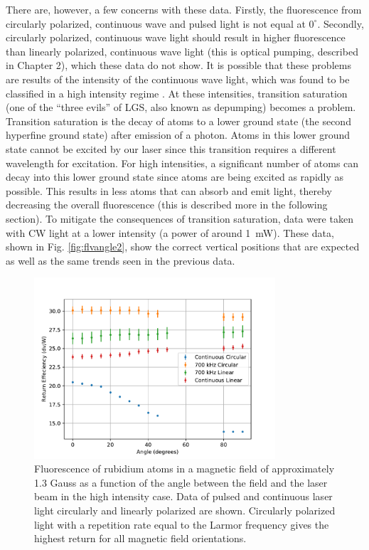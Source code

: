 There are, however, a few concerns with these data. Firstly, the fluorescence from circularly polarized, continuous wave and pulsed light is not equal at $0^{\circ}$. Secondly, circularly polarized, continuous wave light should result in higher fluorescence than linearly polarized, continuous wave light (this is optical pumping, described in Chapter 2), which these data do not show. It is possible that these problems are results of the intensity of the continuous wave light, which was found to be classified in a high intensity regime \cite{Kane2014}. At these intensities, transition saturation (one of the ``three evils'' of LGS, also known as depumping) becomes a  problem. Transition saturation is the decay of atoms to a lower ground state (the second hyperfine ground state) after emission of a photon. Atoms in this lower ground state cannot be excited by our laser since this transition requires a different wavelength for excitation. For high intensities, a significant number of atoms can decay into this lower ground state since atoms are being excited as rapidly as possible. This results in less atoms that can absorb and emit light, thereby decreasing the overall fluorescence (this is described more in the following section). To mitigate the consequences of transition saturation, data were taken with CW light at a lower intensity (a power of around \SI{1}{\milli \watt}). These data, shown in Fig. \ref{fig:flvangle2}, show the correct vertical positions that are expected as well as the same trends seen in the previous data. 


\begin{figure}[htb]
	\centering
	\includegraphics[width=0.8\textwidth]{../../MRPData/MAR24/together.pdf}
	\caption{Fluorescence of rubidium atoms in a magnetic field of approximately 1.3 Gauss as a function of the angle between the field and the laser beam in the high intensity case. Data of pulsed and continuous laser light circularly and linearly polarized are shown. Circularly polarized light with a repetition rate equal to the Larmor frequency gives the highest return for all magnetic field orientations.}
	\label{fig:flvangle}
\end{figure}

